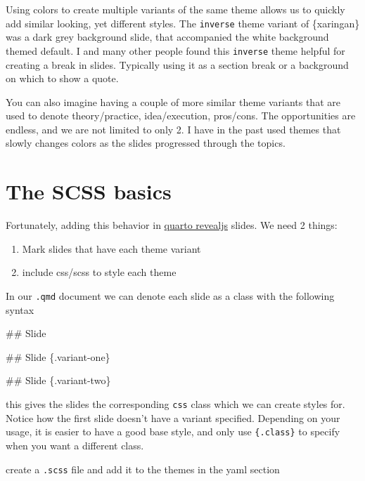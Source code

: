 \documentclass[
  letterpaper,
  DIV=11,
  numbers=noendperiod]{scrreprt}
\newenvironment{Shaded}{\begin{snugshade}}{\end{snugshade}}
\newcommand{\FunctionTok}[1]{\textcolor[rgb]{0.28,0.35,0.67}{#1}}
\providecommand{\tightlist}{%
  \setlength{\itemsep}{0pt}\setlength{\parskip}{0pt}}\usepackage{longtable,booktabs,array}
\begin{document}
Using colors to create multiple variants of the same theme allows us to
quickly add similar looking, yet different styles. The \texttt{inverse}
theme variant of \{xaringan\} was a dark grey background slide, that
accompanied the white background themed default. I and many other people
found this \texttt{inverse} theme helpful for creating a break in
slides. Typically using it as a section break or a background on which
to show a quote.

You can also imagine having a couple of more similar theme variants that
are used to denote theory/practice, idea/execution, pros/cons. The
opportunities are endless, and we are not limited to only 2. I have in
the past used themes that slowly changes colors as the slides progressed
through the topics.

\section{The SCSS basics}\label{the-scss-basics}

Fortunately, adding this behavior in
\href{https://quarto.org/docs/presentations/revealjs/}{quarto revealjs}
slides. We need 2 things:

\begin{enumerate}
\def\labelenumi{\arabic{enumi}.}
\tightlist
\item
  Mark slides that have each theme variant
\item
  include css/scss to style each theme
\end{enumerate}

In our \texttt{.qmd} document we can denote each slide as a class with
the following syntax

\begin{Shaded}
\begin{Highlighting}[]
\FunctionTok{\#\# Slide}

\FunctionTok{\#\# Slide \{.variant{-}one\}}

\FunctionTok{\#\# Slide \{.variant{-}two\}}
\end{Highlighting}
\end{Shaded}

this gives the slides the corresponding \texttt{css} class which we can
create styles for. Notice how the first slide doesn't have a variant
specified. Depending on your usage, it is easier to have a good base
style, and only use \texttt{\{.class\}} to specify when you want a
different class.

create a \texttt{.scss} file and add it to the themes in the yaml
section
\end{document}

